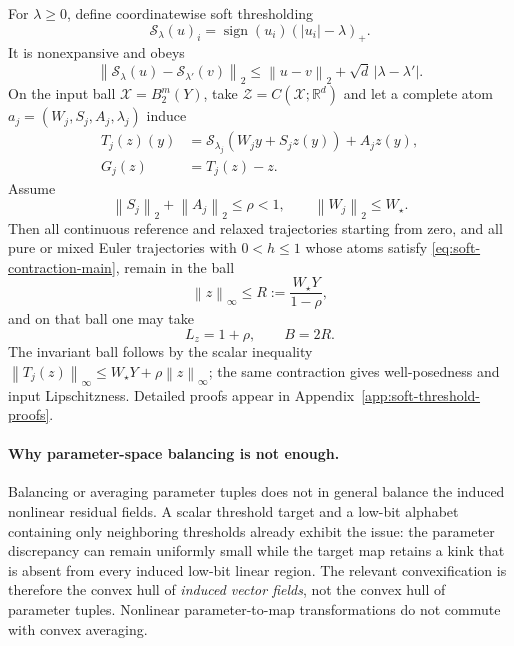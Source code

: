 \documentclass[twoside,11pt]{article}
\newcommand{\Z}{\mathcal{Z}}
\newcommand{\soft}{\mathcal{S}}
\newcommand{\norm}[1]{\left\lVert #1\right\rVert}
\newcommand{\abs}[1]{\left\lvert #1\right\rvert}
\begin{document}
For $\lambda\ge0$, define coordinatewise soft thresholding
\begin{equation}
 \soft_\lambda(u)_i
 =\operatorname{sign}(u_i)(\abs{u_i}-\lambda)_+.
 \label{eq:soft-threshold-main}
\end{equation}
It is nonexpansive and obeys
\begin{equation}
 \norm{\soft_\lambda(u)-\soft_{\lambda'}(v)}_2
 \le\norm{u-v}_2+\sqrt d\,\abs{\lambda-\lambda'}.
 \label{eq:soft-lipschitz-main}
\end{equation}
On the input ball $\mathcal X=B_2^m(Y)$, take $\Z=C(\mathcal X;\mathbb R^d)$ and let a complete atom $a_j=(W_j,S_j,A_j,\lambda_j)$ induce
\begin{align}
 T_j(z)(y)&=\soft_{\lambda_j}(W_jy+S_jz(y))+A_jz(y),\\
 G_j(z)&=T_j(z)-z.
 \label{eq:soft-field-main}
\end{align}
Assume
\begin{equation}
 \norm{S_j}_2+\norm{A_j}_2\le\rho<1,
 \qquad
 \norm{W_j}_2\le W_\star.
 \label{eq:soft-contraction-main}
\end{equation}
Then all continuous reference and relaxed trajectories starting from zero, and all pure or mixed Euler trajectories with $0<h\le1$ whose atoms satisfy \eqref{eq:soft-contraction-main}, remain in the ball
\begin{equation}
 \norm z_\infty\le R:=\frac{W_\star Y}{1-\rho},
 \label{eq:soft-invariant-radius-main}
\end{equation}
and on that ball one may take
\begin{equation}
 L_z=1+\rho,
 \qquad B=2R.
 \label{eq:soft-field-constants-main}
\end{equation}
The invariant ball follows by the scalar inequality $\norm{T_j(z)}_\infty\le W_\star Y+\rho\norm z_\infty$; the same contraction gives well-posedness and input Lipschitzness.  Detailed proofs appear in Appendix~\ref{app:soft-threshold-proofs}.

\paragraph{Why parameter-space balancing is not enough.}
Balancing or averaging parameter tuples does not in general balance the
induced nonlinear residual fields.  A scalar threshold target and a low-bit
alphabet containing only neighboring thresholds already exhibit the issue:
the parameter discrepancy can remain uniformly small while the target map
retains a kink that is absent from every induced low-bit linear region.  The
relevant convexification is therefore the convex hull of \emph{induced vector
fields}, not the convex hull of parameter tuples.  Nonlinear parameter-to-map
transformations do not commute with convex averaging.
\end{document}
